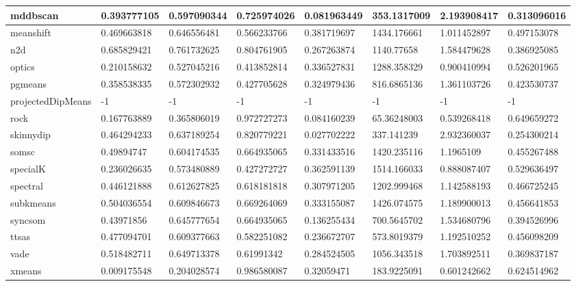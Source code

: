\begin{table}[H]
\begin{tabular}{|l|l|l|l|l|l|l|l|}
\hline
mddbscan & 0.393777105 & 0.597090344 & 0.725974026 & 0.081963449 & 353.1317009 & 2.193908417 & 0.313096016 \\
\hline
meanshift & 0.469663818 & 0.646556481 & 0.566233766 & 0.381719697 & 1434.176661 & 1.011452897 & 0.497153078 \\
\hline
n2d & 0.685829421 & 0.761732625 & 0.804761905 & 0.267263874 & 1140.77658 & 1.584479628 & 0.386925085 \\
\hline
optics & 0.210158632 & 0.527045216 & 0.413852814 & 0.336527831 & 1288.358329 & 0.900410994 & 0.526201965 \\
\hline
pgmeans & 0.358538335 & 0.572302932 & 0.427705628 & 0.324979436 & 816.6865136 & 1.361103726 & 0.423530737 \\
\hline
projectedDipMeans & -1 & -1 & -1 & -1 & -1 & -1 & -1 \\
\hline
rock & 0.167763889 & 0.365806019 & 0.972727273 & 0.084160239 & 65.36248003 & 0.539268418 & 0.649659272 \\
\hline
skinnydip & 0.464294233 & 0.637189254 & 0.820779221 & 0.027702222 & 337.141239 & 2.932360037 & 0.254300214 \\
\hline
somsc & 0.49894747 & 0.604174535 & 0.664935065 & 0.331433516 & 1420.235116 & 1.1965109 & 0.455267488 \\
\hline
specialK & 0.236026635 & 0.573480889 & 0.427272727 & 0.362591139 & 1514.166033 & 0.888087407 & 0.529636497 \\
\hline
spectral & 0.446121888 & 0.612627825 & 0.618181818 & 0.307971205 & 1202.999468 & 1.142588193 & 0.466725245 \\
\hline
subkmeans & 0.504036554 & 0.609846673 & 0.669264069 & 0.333155087 & 1426.074575 & 1.189900013 & 0.456641853 \\
\hline
syncsom & 0.43971856 & 0.645777654 & 0.664935065 & 0.136255434 & 700.5645702 & 1.534680796 & 0.394526996 \\
\hline
ttsas & 0.477094701 & 0.609377663 & 0.582251082 & 0.236672707 & 573.8019379 & 1.192510252 & 0.456098209 \\
\hline
vade & 0.518482711 & 0.649713378 & 0.61991342 & 0.284524505 & 1056.343518 & 1.703892511 & 0.369837187 \\
\hline
xmeans & 0.009175548 & 0.204028574 & 0.986580087 & 0.32059471 & 183.9225091 & 0.601242662 & 0.624514962 \\
\hline
\end{tabular}
\end{table}